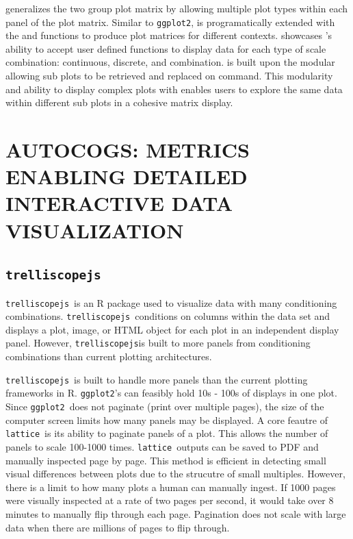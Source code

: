 \documentclass[stat,dissertation]{puthesis}\usepackage[]{graphicx}\usepackage{xcolor}
\newcommand{\pkg}[1]{\texttt{#1}}
\newcommand{\ggplot}{\pkg{ggplot2}}
\newcommand{\trelliscopejs}{\pkg{trelliscopejs}}
\begin{document}
   generalizes the two group plot matrix by allowing multiple plot types within each panel of the plot matrix.  Similar to \ggplot,  is programatically extended with the  and  functions to produce plot matrices for different contexts.   showcases 's ability to accept user defined functions to display data for each type of scale combination: continuous, discrete, and combination.  is built upon the modular  allowing sub plots to be retrieved and replaced on command.  This modularity and ability to display complex plots with  enables users to explore the same data within different sub plots in a cohesive matrix display.

\chapter{AUTOCOGS: METRICS ENABLING DETAILED INTERACTIVE DATA VISUALIZATION} \label{chapter:autocogs}


\section{\trelliscopejs}

\trelliscopejs~is an R package used to visualize data with many conditioning combinations.  \trelliscopejs~conditions on columns within the data set and displays a plot, image, or HTML object for each plot in an independent display panel.  However, \trelliscopejs is built to more panels from conditioning combinations than current plotting architectures.

\trelliscopejs~is built to handle more panels than the current plotting frameworks in R. \ggplot's  can feasibly hold 10s - 100s of displays in one plot.  Since \ggplot~does not paginate (print over multiple pages), the size of the computer screen limits how many panels may be displayed.  A core feautre of \pkg{lattice}~is its ability to paginate panels of a plot.  This allows the number of panels to scale 100-1000 times.  \pkg{lattice}~outputs can be saved to PDF and manually inspected page by page.  This method is efficient in detecting small visual differences between plots due to the strucutre of small multiples.  However, there is a limit to how many plots a human can manually ingest.  If 1000 pages were visually inspected at a rate of two pages per second, it would take over 8 minutes to manually flip through each page.  Pagination does not scale with large data when there are millions of pages to flip through.
\end{document}
